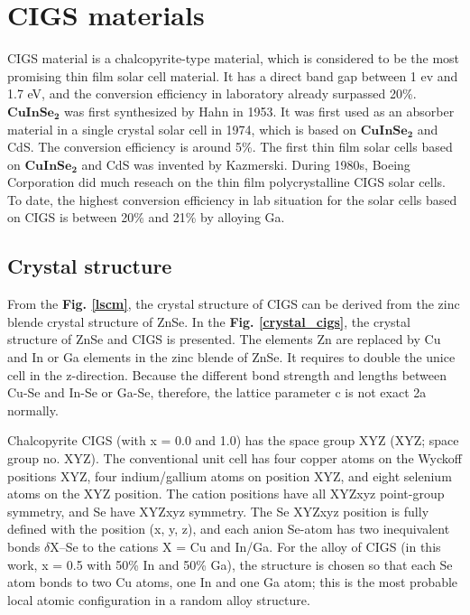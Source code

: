 \documentclass[a4paper, 12pt, titlepage,oneside,drop]{kthesis}
\begin{document}
\section{CIGS materials}
CIGS material is a chalcopyrite-type material, which is considered to be the most promising thin film solar cell material. It has a direct band gap between 1 ev and 1.7 eV,  and the conversion efficiency in laboratory already surpassed 20\%. 
$\mathbf {CuInSe_{2}}$ was first synthesized by Hahn in 1953. It was first used as an absorber material in a single crystal solar cell in 1974, which is based on $\mathbf {CuInSe_{2}}$ and CdS. The conversion efficiency is around 
5\%. The first thin film solar cells based on $\mathbf {CuInSe_{2}}$ and CdS was invented by Kazmerski. During 1980s, Boeing Corporation did much reseach on the thin film polycrystalline CIGS solar cells. 
To date, the highest conversion efficiency in lab situation for the solar cells based on CIGS is between 20\% and 21\% by alloying Ga.


\subsection{Crystal structure}
From the \textbf{Fig. \ref{lscm}}, the crystal structure of CIGS can be derived from the zinc blende crystal structure of ZnSe. In the \textbf{Fig. \ref{crystal_cigs}}, the crystal structure of ZnSe and CIGS is presented. 
The elements Zn are replaced by Cu and In or Ga elements in the zinc blende of ZnSe. It requires to double the unice cell in the z-direction. Because the different bond strength and lengths between
Cu-Se and In-Se or Ga-Se, therefore, the lattice parameter c is not exact 2a normally.

Chalcopyrite CIGS (with x = 0.0 and 1.0) has the space group XYZ (XYZ; space group no. XYZ).
The conventional unit cell has four copper atoms on the Wyckoff positions XYZ, four indium/gallium atoms on position XYZ, and eight selenium atoms on the XYZ position. 
The cation positions have all XYZxyz point-group symmetry, and Se have XYZxyz symmetry. 
The Se XYZxyz position is fully defined with the position (x, y, z), and each anion Se-atom has two inequivalent bonds $\delta$X–Se to the cations X = Cu and In/Ga. 
For the alloy of CIGS (in this work, x = 0.5 with 50\% In and 50\% Ga), the structure is chosen so that each Se atom bonds to two Cu atoms, one In and one Ga atom;
this is the most probable local atomic configuration in a random alloy structure.
\end{document}
